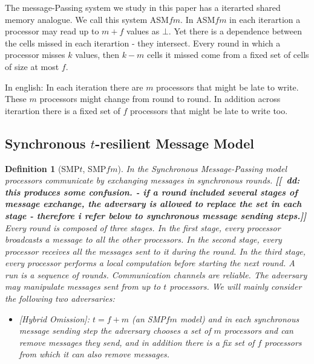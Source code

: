 \documentclass[11pt]{article}
\newtheorem{definition}{Definition}
\newcommand{\ASMfm}{\mbox{ASM\!$f\!m$}\xspace}
\newcommand{\SMPfm}{\mbox{SMP\!$f\!m$}\xspace}
\newcounter{todocounter}
\newcommand{\todonum}
{\stepcounter{todocounter}{(\thetodocounter)}}
\newcommand{\dd}[1]{\textbf{\color{blue}
[[\todonum\ dd: #1]]}}
\begin{document}
{The message-Passing system we study in this paper has a iterarted shared memory analogue.
We call this system \ASMfm. In \ASMfm in each iterartion a processor may read up to $m+f$ values as $\bot$.
Yet there is a dependence between the cells missed in each iterartion - they intersect.
Every round in which a processor misses $k$ values, then $k-m$ cells it missed come from a fixed set of cells
of size at most $f$.

In english: In each iteration there are $m$ processors that might be late to write. These $m$ processors might change
from round to round. In addition across iterartion there is a fixed set of $f$ processors that might be late to write too.




\subsection{Synchronous $t$-resilient Message Model}

 \begin{definition}[SMP$t$, \SMPfm] In the Synchronous Message-Passing model processors communicate by exchanging messages in synchronous rounds. 
 \dd{this produces some confusion. - if a round included several stages of message exchange, the adversary is allowed to replace the set in each stage - therefore i refer below to synchronous message sending steps.}
Every round is composed of three stages. In the
first stage, every processor broadcasts a message to all the other processors. In the
second stage, every processor receives all the messages sent to it during the round.
In the third stage, every processor performs a local computation before starting the
next round. A run is a sequence of rounds.  Communication
channels are reliable.
The adversary may manipulate messages sent from up to $t$ processors.
We will mainly consider the following two adversaries:
 \begin{itemize}
 \item
 \textup{ [Hybrid Omission]:}
 $t=f+m$ (an \SMPfm model) and in each synchronous message sending step the adversary chooses a set of $m$ processors and can remove  messages they send, and in addition there is a fix set of $f$ processors from which it can also remove messages.
 

\end{itemize}
\end{definition}}
\end{document}
